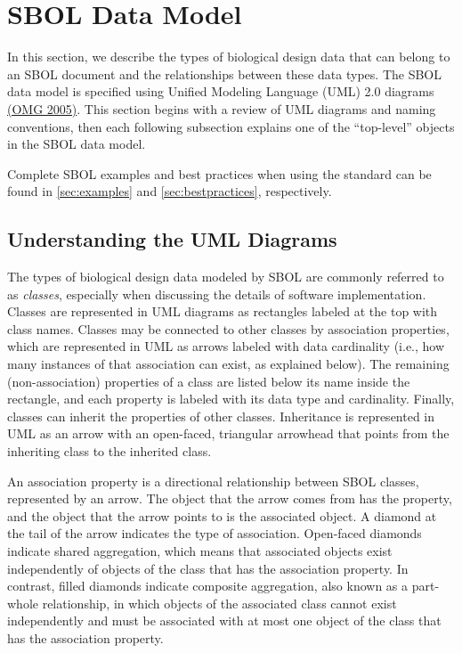 \section{SBOL Data Model}
In this section, we describe the types of biological design data that can belong to an SBOL document and the relationships between these data types. The SBOL data model is specified using Unified Modeling Language (UML) 2.0 diagrams \href{http://www.omg.org/spec/UML/2.0/}{(OMG 2005)}.   
This section begins with a review of UML diagrams and naming conventions, then each following subsection explains one of the ``top-level'' objects in the SBOL data model.

Complete SBOL examples and best practices when using the standard can be found in \ref{sec:examples} and \ref{sec:bestpractices}, respectively. 

\subsection{Understanding the UML Diagrams}

The types of biological design data modeled by SBOL are commonly referred to as {\em classes}, especially when discussing the details of software implementation. Classes are represented in UML diagrams as rectangles labeled at the top with class names. Classes may be connected to other classes by association properties, which are represented in UML as arrows labeled with data cardinality (i.e., how many instances of that association can exist, as explained below). The remaining (non-association) properties of a class are listed below its name inside the rectangle, and each property is labeled with its data type and cardinality. Finally, classes can inherit the properties of other classes. Inheritance is represented in UML as an arrow with an open-faced, triangular arrowhead that points from the inheriting class to the inherited class.

An association property is a directional relationship between SBOL classes, represented by an arrow. The object that the arrow comes from has the property, and the object that the arrow points to is the associated object. A diamond at the tail of the arrow indicates the type of association. Open-faced diamonds indicate shared aggregation, which means that associated objects exist independently of objects of the class that has the association property. In contrast, filled diamonds indicate composite aggregation, also known as a part-whole relationship, in which objects of the associated class cannot exist independently and must be associated with at most one object of the class that has the association property. 

